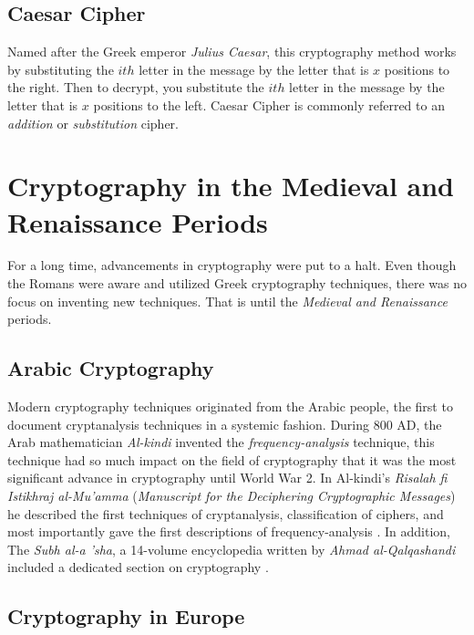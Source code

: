 \subsection{Caesar Cipher}

Named after the Greek emperor \textit{Julius Caesar}, this cryptography method works by substituting the $ith$ letter in the 
message by the letter that is $x$ positions to the right. Then to decrypt, you substitute the $ith$ letter in the message by 
the letter that is $x$ positions to the left. Caesar Cipher is commonly referred to an \textit{addition} or \textit{substitution} 
cipher.

\section{Cryptography in the Medieval and Renaissance Periods}

For a long time, advancements in cryptography were put to a halt. Even though the Romans were aware and utilized Greek 
cryptography techniques, there was no focus on inventing new techniques. That is until the \textit{Medieval and Renaissance}
periods.

\subsection{Arabic Cryptography}

Modern cryptography techniques originated from the Arabic people, the first to document cryptanalysis techniques 
in a systemic fashion. During 800 AD, the Arab mathematician \textit{Al-kindi} invented the \textit{frequency-analysis} 
technique, this technique had so much impact on the field of cryptography that it was the most significant advance in
cryptography until World War 2. In Al-kindi's \textit{Risalah fi Istikhraj al-Mu'amma} 
(\textit{Manuscript for the Deciphering Cryptographic Messages}) he described the first techniques of cryptanalysis,
classification of ciphers, and most importantly gave the first descriptions of frequency-analysis .
In addition, The \textit{Subh al-a 'sha}, a 14-volume encyclopedia written by \textit{Ahmad al-Qalqashandi} included a dedicated section
on cryptography \cite{wiki:history_of_cryptography}.
 
\subsection{Cryptography in Europe}

